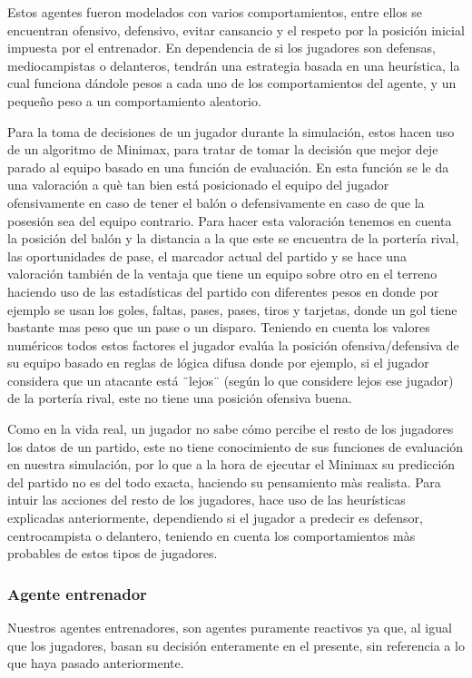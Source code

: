 \documentclass{article}
\begin{document}
Estos agentes fueron modelados con varios comportamientos, entre ellos se encuentran ofensivo, defensivo, evitar cansancio y el respeto por la posición inicial impuesta por el entrenador. En dependencia de si los jugadores son defensas, mediocampistas o delanteros, tendrán una estrategia basada en una heurística, la cual funciona dándole pesos a cada uno de los comportamientos del agente, y un pequeño peso a un comportamiento aleatorio.

Para la toma de decisiones de un jugador durante la simulación, estos hacen uso de un algoritmo de Minimax, para tratar de tomar la decisión que mejor deje parado al equipo basado en una función de evaluación. En esta función se le da una valoración a què tan bien está posicionado el equipo del jugador ofensivamente en caso de tener el balón o defensivamente en caso de que la posesión sea del equipo contrario. Para hacer esta valoración tenemos en cuenta la posición del balón y la distancia a la que este se encuentra de la portería rival, las oportunidades de pase, el marcador actual del partido y se hace una valoración también de la ventaja que tiene un equipo sobre otro en el terreno haciendo uso de las estadísticas del partido con diferentes pesos en donde por ejemplo se usan los goles, faltas, pases, pases, tiros y tarjetas, donde un gol tiene bastante mas peso que un pase  o un disparo. Teniendo en cuenta los valores numéricos todos estos factores el jugador evalúa la posición ofensiva/defensiva de su equipo basado en reglas de lógica difusa donde por ejemplo, si el jugador considera que un atacante está ¨lejos¨ (según lo que considere lejos ese jugador) de la portería rival, este no tiene una posición ofensiva buena.


Como en la vida real, un jugador no sabe cómo percibe el resto de los jugadores los datos de un partido, este no tiene conocimiento de sus funciones de evaluación en nuestra simulación, por lo que a la hora de ejecutar el Minimax su predicción del partido no es del todo exacta, haciendo su pensamiento màs realista. Para intuir las acciones del resto de los jugadores, hace uso de las heurísticas explicadas anteriormente, dependiendo si el jugador a predecir es defensor, centrocampista o delantero, teniendo en cuenta los comportamientos màs probables de estos tipos de jugadores.

\subsubsection{Agente entrenador}
Nuestros agentes entrenadores, son agentes puramente reactivos ya que, al igual que los jugadores, basan su decisión enteramente en el presente, sin referencia a lo que haya pasado anteriormente.
\end{document}
